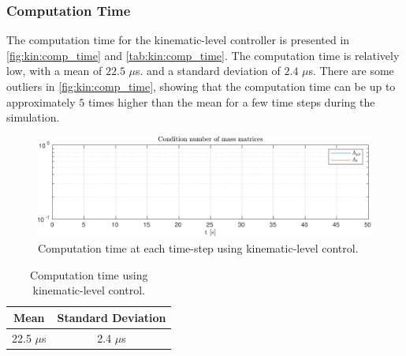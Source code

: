 \subsubsection{Computation Time}

The computation time for the kinematic-level controller is presented in \autoref{fig:kin:comp_time}
and \autoref{tab:kin:comp_time}. The computation time is relatively low, with a mean of $22.5$ $\mu$s.
and a standard deviation of $2.4$ $\mu$s. There are some outliers in \autoref{fig:kin:comp_time},
showing that the computation time can be up to approximately $5$ times higher than the mean
for a few time steps during the simulation.

\begin{figure}[h!]
    \centering
    \includegraphics[page=3,width=\linewidth]{assets/results/kinematic/h5data.pdf}
    \caption{Computation time at each time-step using kinematic-level control.}
    \label{fig:kin:comp_time}
\end{figure}
\begin{table}[h!]
    \centering
    \begin{tabular}{|c|c|}
        \hline
        Mean & Standard Deviation \\ \hline
        22.5 $\mu$s & 2.4 $\mu$s \\ \hline
    \end{tabular}
    \caption{Computation time using kinematic-level control.}
    \label{tab:kin:comp_time}
\end{table}

